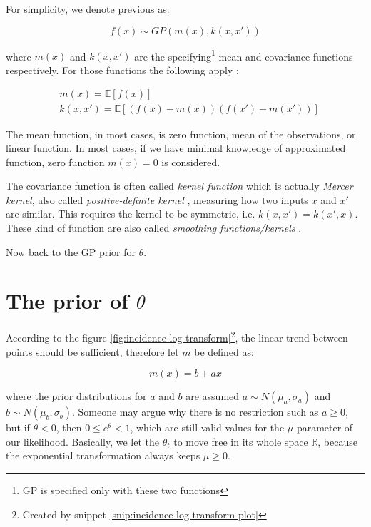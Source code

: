 \documentclass[
  digital, %
  oneside, %
  lof,     %
  lot,     %
]{fithesis4}
\begin{document}
For simplicity, we denote previous as:

\begin{equation}
  f(x) \sim GP \left( m \left( x \right), k \left( x, x' \right) \right)
\end{equation}

where $m \left( x \right)$ and $k\left( x, x' \right)$ are 
the specifying\footnote{GP is specified only with these two functions} mean and
covariance functions respectively.
For those functions the following apply \cite{rasmussen2004}:

\begin{equation}
\begin{split}
  & m(x) = \mathbb{E} \left[ f(x) \right] \\
  & k \left( x, x' \right) = \mathbb{E} \left[ 
    \left( f \left( x \right) - m \left( x \right) \right)
    \left( f \left( x' \right) - m \left( x' \right) \right)
  \right]
\end{split}
\end{equation}

The mean function, in most cases, is zero function,
mean of the observations, or linear function.
In most cases, if we have minimal knowledge of approximated function,
zero function $m(x) = 0$ is considered.

The covariance function is often called 
\textit{kernel function} which is actually \textit{Mercer kernel}, also called 
\textit{positive-definite kernel} \cite{murphy2021}, 
measuring how two inputs $x$ and $x'$ are similar. 
This requires the kernel to be symmetric, i.e. 
$k \left( x, x' \right) = k \left( x', x \right)$.
These kind of function are also called
\textit{smoothing functions/kernels} \cite{martin2016}.

Now back to the GP prior for $\theta$.

\section{The prior of \texorpdfstring{$\theta$}{Lg}}

According to the figure \ref{fig:incidence-log-transform}\footnote{Created by snippet \ref{snip:incidence-log-transform-plot}}, 
the linear trend between points should be sufficient, 
therefore let $m$ be defined as:

\begin{equation}
m(x) = b + a x
\end{equation}

where the prior distributions for $a$ and $b$ 
are assumed 
$a \sim N \left( \mu_a, \sigma_a \right)$ and 
$b \sim N \left( \mu_b, \sigma_b \right)$.
Someone may argue why there is no restriction such as
$a \geq 0$, but if $\theta < 0$, then $0 \leq e^{\theta} < 1$, 
which are still valid values for the $\mu$ parameter
of our likelihood.
Basically, we let the $\theta_t$ to move
free in its whole space $\mathbb{R}$, because the
exponential transformation always keeps $\mu \geq 0$.
\end{document}
